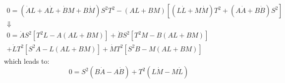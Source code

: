 \[\begin{array}{c}
0 = \left( {\dot AL + A\dot L + \dot BM + B\dot M} \right){S^2}{T^2} - \left( {AL + BM} \right)\left[ {\left( {L\dot L + M\dot M} \right){T^2} + \left( {A\dot A + B\dot B} \right){S^2}} \right]\\
 \Downarrow \\
0 = \dot A{S^2}\left[ {{T^2}L - A\left( {AL + BM} \right)} \right] + \dot B{S^2}\left[ {{T^2}M - B\left( {AL + BM} \right)} \right]\\
 + \dot L{T^2}\left[ {{S^2}A - L\left( {AL + BM} \right)} \right] + \dot M{T^2}\left[ {{S^2}B - M\left( {AL + BM} \right)} \right]
\end{array}\]
which leads to:
\begin{equation}
0 = {S^2}\left( {B\dot A - A\dot B} \right) + {T^2}\left( {L\dot M - M\dot L} \right)
\end{equation}
